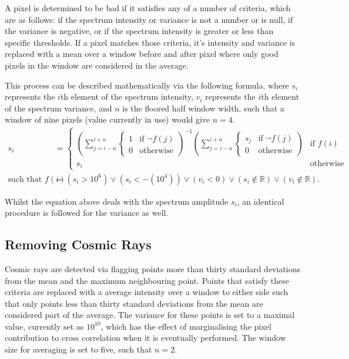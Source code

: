 \documentclass[titlesmallcaps, examinerscopy, copyrightpage]{uqthesis}
\newcommand{\brac}[1]{\left( #1 \right)}
\begin{document}
A pixel is determined to be bad if it satisfies any of a number of criteria, which are as follows: if the spectrum intensity or variance is not a number or is null, if the variance is negative, or if the spectrum intensity is greater or less than specific thresholds. If a pixel matches those criteria, it's intensity and variance is replaced with a mean over a window before and after pixel where only good pixels in the window are considered in the average.

This process can be described mathematically via the following formula, where $s_i$ represents the $i$th element of the spectrum intensity, $v_i$ represents the $i$th element of the spectrum variance, and $n$ is the floored half window width, such that a window of nine pixels (value currently in use) would give $n=4$.
\begin{align}
s_i &= 
\begin{cases}
	\brac{\sum\limits_{j=i-n}^{i+n} \begin{cases}1 & \text{if } \lnot f(j) \\ 0 & \text{otherwise} \end{cases}}^{-1}\brac{\sum\limits_{j=i-n}^{i+n} \begin{cases}s_j & \text{if } \lnot f(j) \\ 0 & \text{otherwise} \end{cases}} & \text{if } f(i) \\
	s_i & \text{otherwise}
\end{cases}\\
\text{such that } f(i) &= \brac{s_i > 10^6} \vee \brac{s_i <  -\left(10^4\right)} \vee \brac{v_i < 0} \vee \brac{s_i \notin \mathbb{R}} \vee \brac{v_i \notin \mathbb{R}}.
\end{align} 

Whilst the equation above deals with the spectrum amplitude $s_i$, an identical procedure is followed for the variance as well.

\pagebreak
\subsection{Removing Cosmic Rays}

Cosmic rays are detected via flagging points more than thirty standard deviations from the mean and the maximum neighbouring point. Points that satisfy these criteria are replaced with a average intensity over a window to either side such that only points less than thirty standard deviations from the mean are considered part of the average. The variance for these points is set to a maximal value, currently set as $10^{10}$, which has the effect of marginalising the pixel contribution to cross correlation when it is eventually performed. The window size for averaging is set to five, such that $n = 2$.
\end{document}

